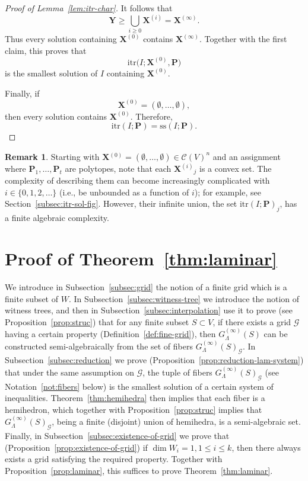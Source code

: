 \documentclass[10pt]{amsart}
\theoremstyle{plain}
\theoremstyle{definition}
\newtheorem{remark}[lemma]{Remark}
\providecommand{\cC}[0]{\ensuremath{\mathcal C}\xspace}
\providecommand{\cG}[0]{\ensuremath{\mathcal G}\xspace}
\providecommand{\bP}[0]{\ensuremath{\mathbf P}\xspace}
\providecommand{\bX}[0]{\ensuremath{\mathbf X}\xspace}
\let\leq\leqslant
\let\geq\geqslant
\providecommand{\p}[1]{\ensuremath{^{\left(#1\right)}}\xspace}
\providecommand{\convset}[0]{\ensuremath{\cC}\xspace}
\providecommand{\ssol}{\ensuremath{\mathrm{ss}}\xspace}
\providecommand{\itr}[0]{\ensuremath{\mathrm{itr}}\xspace}
\begin{document}
\begin{proof}[Proof of Lemma~\ref{lem:itr-char}]
It follows that
\[
\mathbf Y
\geq
\bigcup_{i\geq 0}\mathbf X^{(i)}
=
\mathbf X^{(\infty)}.
\]
Thus every solution containing \(\mathbf X^{(0)}\) contains
\(\mathbf X^{(\infty)}\). Together with the first claim, this proves
that
\[
\itr
\bigl(I;\mathbf X^{(0)},\mathbf P\bigr)
\]
is the smallest solution of \(I\) containing \(\mathbf X^{(0)}\).

Finally, if
\[
\mathbf X^{(0)}=(\emptyset,\ldots,\emptyset),
\]
then every solution contains \(\mathbf X^{(0)}\). Therefore,
\[
\itr(I;\mathbf P)
=
\ssol(I;\mathbf P).
\]
\end{proof}




\begin{remark}
    Starting with $\bX\p0 = (\emptyset,\dotsc,\emptyset)\in\convset(V)^n$ and an assignment where $\bP_1,\dotsc,\bP_t$ are polytopes, note that each $\bX\p i_j$ is a convex set. 
    The complexity of describing them can become increasingly complicated 
    with $i\in\{0,1,2,\dotsc\}$ 
(i.e., be unbounded as a function of $i$); for example, see Section~\ref{subsec:itr-sol-fig}. 
    However, their infinite union, the set $\itr(I;\bP)_j$, has a finite algebraic complexity. 
\end{remark}




\section{Proof of Theorem~\ref{thm:laminar}}
\label{sec:laminar}
We introduce in Subsection~\ref{subsec:grid} the notion of a finite grid
which is a finite subset of $W$. In Subsection~\ref{subsec:witness-tree} we 
introduce the notion of witness trees, and then in 
Subsection~\ref{subsec:interpolation} use it to prove (see Proposition~\ref{prop:struc}) that for any finite subset $S \subset V$, if there exists a grid $\cG$ having a certain property (Definition~\ref{def:fine-grid}), then $G^{(\infty)}_\Lambda(S)$ can be constructed semi-algebraically from the set of fibers  $G^{(\infty)}_\Lambda(S)_{\cG}$.
In Subsection~\ref{subsec:reduction}
we prove (Proposition~\ref{prop:reduction-lam-system}) 
that under the same assumption on $\cG$,
the tuple of fibers $G^{(\infty)}_\Lambda(S)_{\cG}$ (see Notation~\ref{not:fibers} below)
is the smallest solution of a certain system of inequalities. Theorem~\ref{thm:hemihedra} then implies that each fiber is a hemihedron, which together with Proposition~\ref{prop:struc}
implies that $G^{(\infty)}_\Lambda(S)_{\cG}$, being a finite (disjoint) union of hemihedra,
is a semi-algebraic set. Finally, in Subsection~\ref{subsec:existence-of-grid} we prove that (Proposition~\ref{prop:existence-of-grid}) if $\dim W_i = 1, 1 \leq i \leq k$, then there always exists a grid satisfying the required property. Together with Proposition~\ref{prop:laminar}, this suffices to prove Theorem~\ref{thm:laminar}.
\end{document}
